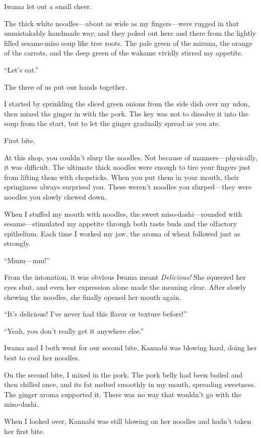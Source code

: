 \documentclass[
    a4paper,
    12pt,
    twoside,
    openany,
    UTF8,
    fontset=windows
]{ctexbook}
\begin{document}
Iwama let out a small cheer.

The thick white noodles---about as wide as my fingers---were rugged in that unmistakably handmade way, and they poked out here and there from the lightly filled sesame-miso soup like tree roots. The pale green of the mizuna, the orange of the carrots, and the deep green of the wakame vividly stirred my appetite.

``Let's eat.''

The three of us put our hands together.

I started by sprinkling the sliced green onions from the side dish over my udon, then mixed the ginger in with the pork. The key was not to dissolve it into the soup from the start, but to let the ginger gradually spread as you ate.

First bite.

At this shop, you couldn't slurp the noodles. Not because of manners---physically, it was difficult. The ultimate thick noodles were enough to tire your fingers just from lifting them with chopsticks. When you put them in your mouth, their springiness always surprised you. These weren't noodles you slurped---they were noodles you slowly chewed down.

When I stuffed my mouth with noodles, the sweet miso-dashi---rounded with sesame---stimulated my appetite through both taste buds and the olfactory epithelium. Each time I worked my jaw, the aroma of wheat followed just as strongly.

``Mmm---mm!''

From the intonation, it was obvious Iwama meant \textit{Delicious!} She squeezed her eyes shut, and even her expression alone made the meaning clear. After slowly chewing the noodles, she finally opened her mouth again.

``It's delicious! I've never had this flavor or texture before!''

``Yeah, you don't really get it anywhere else.''

Iwama and I both went for our second bite. Kannabi was blowing hard, doing her best to cool her noodles.

On the second bite, I mixed in the pork. The pork belly had been boiled and then chilled once, and its fat melted smoothly in my mouth, spreading sweetness. The ginger aroma supported it. There was no way that wouldn't go with the miso-dashi.

When I looked over, Kannabi was still blowing on her noodles and hadn't taken her first bite.
\end{document}
